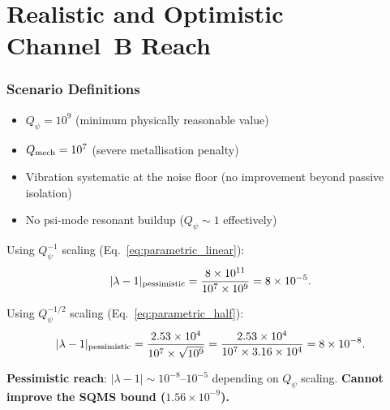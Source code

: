 \documentclass[11pt]{article}
\newcommand{\lam}{\lambda}
\newcommand{\ee}[1]{\times 10^{#1}}
\newcommand{\Qpsi}{Q_\psi}
\newcommand{\Qmech}{Q_{\rm mech}}
\newcommand{\lbone}{|\lam - 1|}
\theoremstyle{definition}
\theoremstyle{remark}
\begin{document}
\part{Realistic and Optimistic Channel~B Reach}
\label{part:reach}

\section{Scenario Definitions}
\label{sec:scenarios}

\begin{tcolorbox}[colback=red!3!white, colframe=red!60!black,
  title=\textbf{PESSIMISTIC (Conservative) Scenario}]
\begin{itemize}[nosep]
\item $\Qpsi = 10^{9}$ (minimum physically reasonable value)
\item $\Qmech = 10^{7}$ (severe metallisation penalty)
\item Vibration systematic at the noise floor (no improvement
  beyond passive isolation)
\item No psi-mode resonant buildup ($\Qpsi \sim 1$ effectively)
\end{itemize}

Using $\Qpsi^{-1}$ scaling (Eq.~\eqref{eq:parametric_linear}):
\begin{equation}
\lbone_{\rm pessimistic} = \frac{8\ee{11}}{10^{7}\times 10^{9}}
= 8\ee{-5}.
\end{equation}

Using $\Qpsi^{-1/2}$ scaling (Eq.~\eqref{eq:parametric_half}):
\begin{equation}
\lbone_{\rm pessimistic} = \frac{2.53\ee{4}}{10^{7}\times\sqrt{10^{9}}}
= \frac{2.53\ee{4}}{10^{7}\times 3.16\ee{4}} = 8\ee{-8}.
\end{equation}

\textbf{Pessimistic reach}: $\lbone \sim 10^{-8}$--$10^{-5}$
depending on $\Qpsi$ scaling. \textbf{Cannot improve the SQMS bound
($1.56\ee{-9}$).}
\end{tcolorbox}
\end{document}
